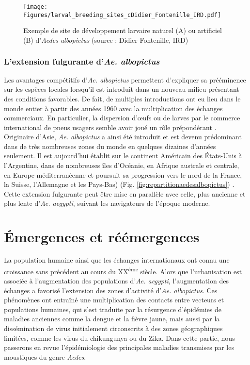 \begin{figure}[t]
	\centering
	\texttt{[image: Figures/larval\_breeding\_sites\_cDidier\_Fontenille\_IRD.pdf]}
	\caption{Exemple de site de développement larvaire naturel (A) ou artificiel (B) d'{\em Aedes albopictus} (source : Didier Fontenille, IRD)}
	\label{fig:larval_breeding}
\end{figure}

\subsubsection{L'extension fulgurante d'{\em Ae. albopictus}}

Les avantages compétitifs d'{\em Ae. albopictus} permettent d'expliquer sa prééminence sur les espèces locales lorsqu'il est introduit dans un nouveau milieu présentant des conditions favorables.
De fait, de multiples introductions ont eu lieu dans le monde entier à partir des années 1960 avec la multiplication des échanges commerciaux.
En particulier, la dispersion d'\oe ufs ou de larves par le commerce international de pneus usagers semble avoir joué un rôle prépondérant \cite{reiter1998aedes}.
Originaire d'Asie, {\em Ae. albopictus} a ainsi été introduit et est devenu prédominant dans de très nombreuses zones du monde en quelques dizaines d'années seulement.
Il est aujourd'hui établit sur le continent Américain des États-Unis à l'Argentine, dans de nombreuses îles d'Océanie, en Afrique australe et centrale, en Europe méditerranéenne et poursuit sa progression vers le nord de la France, la Suisse, l'Allemagne et les Pays-Bas) (Fig. \ref{fig:repartitionaedesalbopictus}) \cite{kraemer2015global}.
Cette extension fulgurante peut être mise en parallèle avec celle, plus ancienne et plus lente d'{\em Ae. aegypti}, suivant les navigateurs de l'époque moderne.


\section[Émergences \& réémergences]{Émergences et réémergences}

La population humaine ainsi que les échanges internationaux ont connu une croissance sans précédent au cours du XX\textsuperscript{ème} siècle.
Alors que l'urbanisation est associée à l'augmentation des populations d'{\em Ae. aegypti}, l'augmentation des échanges a favorisé l'extension des zones d'activité d'{\em Ae. albopictus}. 
Ces phénomènes ont entraîné une multiplication des contacts entre vecteurs et populations humaines, qui s'est traduite par la résurgence d'épidémies de maladies anciennes comme la dengue et la fièvre jaune, mais aussi par la dissémination de virus initialement circonscrits à des zones géographiques limitées, comme les virus du chikungunya ou du Zika.
Dans cette partie, nous passerons en revue l'épidémiologie des principales maladies transmises par les moustiques du genre {\em Aedes}.


